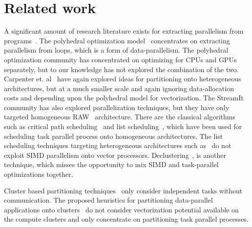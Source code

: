 \section{Related work}
\label{sec:related-work}

A significant amount of research literature exists for extracting
parallelism from programs~\cite{mgri98,jdon06,mgor06,gsih93,pcar09}. The
polyhedral optimization model~\cite{mgri98} concentrates on extracting
parallelism from loops, which is a form of data-parallelism. The
polyhedral optimization community has concentrated on optimizing for
CPUs and GPUs separately, but to our knowledge has not explored the
combination of the two. Carpenter et. al~\cite{pcar09} have again
explored ideas for partitioning onto heterogeneous architectures, but at
a much smaller scale and again ignoring data-allocation costs and
depending upon the polyhedral model for vectorization. The
StreamIt~\cite{wthi02} community has also explored parallelization
techniques, but they have only targeted homogeneous RAW~\cite{ewai97}
architecture. There are the classical algorithms such as critical path
scheduling~\cite{Kohler1975} and list scheduling~\cite{atho74}, which
have been used for scheduling task parallel process onto homogeneous
architectures. The list scheduling techniques targeting heterogeneous
architectures such as~\cite{htop02} do not exploit SIMD parallelism onto
vector processors. Declustering~\cite{gsih93}, is another technique,
which misses the opportunity to mix SIMD and task-parallel optimizations
together.

Cluster based partitioning techniques~\cite{mmah99,adou04,tbra01} only
consider independent tasks without communication. The proposed
heuristics for partitioning data-parallel applications onto
clusters~\cite{ssan05,skum02} do not consider vectorization potential
available on the compute clusters and only concentrate on partitioning
task parallel processes.



